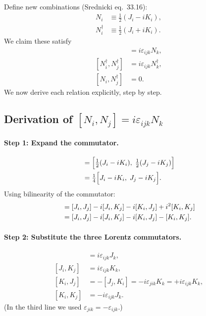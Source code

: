 Define new combinations (Srednicki eq.~33.16):
\begin{align}
  N_i &\equiv \tfrac{1}{2}(J_i - iK_i),
  \label{eq:Ndef}\\
  N_i^\dagger &\equiv \tfrac{1}{2}(J_i + iK_i).
  \label{eq:Ndagdef}
\end{align}
We claim these satisfy
\begin{align}
  [N_i, N_j] &= i\varepsilon_{ijk}N_k,
  \label{eq:NN}\\
  [N_i^\dagger, N_j^\dagger] &= i\varepsilon_{ijk}N_k^\dagger,
  \label{eq:NdagNdag}\\
  [N_i, N_j^\dagger] &= 0.
  \label{eq:NNdag}
\end{align}
We now derive each relation explicitly, step by step.

\subsection{Derivation of \texorpdfstring{$[N_i,N_j]=i\varepsilon_{ijk}N_k$}{[N,N]=iepsN}}

\paragraph{Step 1: Expand the commutator.}
\begin{align}
  [N_i, N_j]
  &= \Bigl[\tfrac{1}{2}(J_i - iK_i),\; \tfrac{1}{2}(J_j - iK_j)\Bigr]
  \notag\\
  &= \tfrac{1}{4}\Bigl[J_i - iK_i,\; J_j - iK_j\Bigr].
\end{align}
Using bilinearity of the commutator:
\begin{align}
  [J_i - iK_i,\; J_j - iK_j]
  &= [J_i, J_j]
     - i[J_i, K_j]
     - i[K_i, J_j]
     + i^2[K_i, K_j]
  \notag\\
  &= [J_i, J_j]
     - i[J_i, K_j]
     - i[K_i, J_j]
     - [K_i, K_j].
  \label{eq:NN_expand}
\end{align}

\paragraph{Step 2: Substitute the three Lorentz commutators.}
\begin{align*}
  [J_i, J_j] &= i\varepsilon_{ijk}J_k,\\
  [J_i, K_j] &= i\varepsilon_{ijk}K_k,\\
  [K_i, J_j] &= -[J_j, K_i] = -i\varepsilon_{jik}K_k = +i\varepsilon_{ijk}K_k,\\
  [K_i, K_j] &= -i\varepsilon_{ijk}J_k.
\end{align*}
(In the third line we used $\varepsilon_{jik} = -\varepsilon_{ijk}$.)

